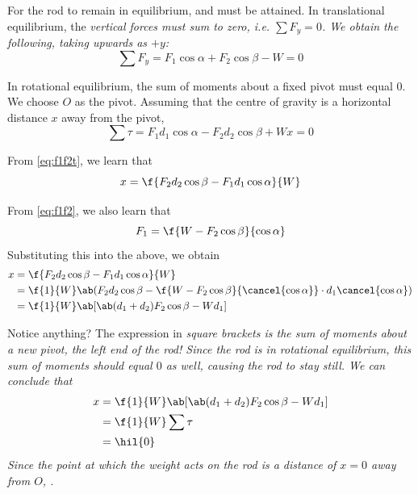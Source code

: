 For the rod to remain in equilibrium, 
and 
must be attained. In translational equilibrium, the \it{vertical}
forces must sum to
zero, i.e. \(\sum{F}_y = 0\).
We obtain the following, taking upwards as \(+y\):
\begin{equation}
	\sum{F}_y = {F}_1\cos\alpha + {F}_2\cos\beta - {W} = 0
	\label{eq:f1f2}
\end{equation}

In rotational equilibrium, the sum of moments about a fixed pivot
must equal \(0\).
We choose \(O\) as the pivot.
Assuming that the centre of gravity is a horizontal distance \(x\)
away from the pivot,
\begin{equation}
	\sum\tau = {F}_1d_1\cos\alpha - {F}_2d_2\cos\beta + {W}x = 0
	\label{eq:f1f2t}
\end{equation}

From \cref{eq:f1f2t}, we learn that
\begin{equation*}
	x = \f{{F}_2d_2\cos\beta - {F}_1d_1\cos\alpha}{W}
\end{equation*}

From \cref{eq:f1f2}, we also learn that
\begin{equation*}
	{F}_1 = \f{{W} - {F}_2\cos\beta}{\cos\alpha}
\end{equation*}
Substituting this into the above, we obtain
\begin{align*}
	x & = \f{{F}_2d_2\cos\beta - {F}_1d_1\cos\alpha}{{W}}   \\
	  & = \f{1}{{W}} \ab({F}_2d_2\cos\beta -
	\f{W - F_2\cos\beta}{\cancel{\cos\alpha}}\cdot
	d_1\cancel{\cos\alpha})                                 \\
	  & = \f{1}{{W}} \ab[\ab(d_1+d_2){F}_2\cos\beta - Wd_1]
\end{align*}

Notice anything? The expression in \it{square brackets} is the sum of moments
about a new pivot, the left end of the rod! Since the rod is in
rotational equilibrium,
this sum of moments should equal \(0\) as well, causing the rod to stay still.
We can conclude that
\begin{align*}
	x & = \f{1}{W} \ab[\ab(d_1+d_2)F_2\cos\beta - Wd_1] \\
	  & = \f{1}{W} \sum\tau                             \\
	  & = \hil{0}
\end{align*}
Since the point at which the weight acts on the rod is a distance of \(x = 0\)
away from \(O\), .

